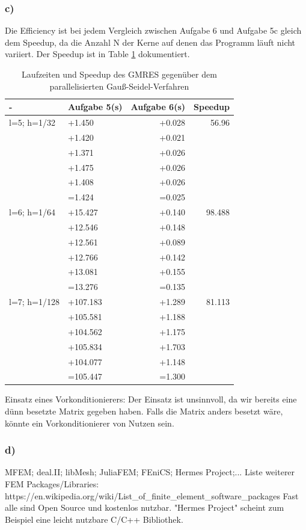 \documentclass{report}
\begin{document}
	\subsubsection{c)}
Die Efficiency ist bei jedem Vergleich zwischen Aufgabe 6 und Aufgabe 5c gleich dem Speedup, da die Anzahl N der Kerne auf denen das Programm läuft nicht variiert. Der Speedup ist in Table \ref{Table:6c} dokumentiert.\\
\begin{table}
\begin{tabular}{|l|l|r|r|}
		\hline
		- & Aufgabe 5(s) & Aufgabe 6(s) & Speedup\\
		\hline
		l=5; h=1/32 &  +1.450 & +0.028 & 56.96 \\
		& +1.420 & +0.021 &    \\
		& +1.371 & +0.026 &    \\
		& +1.475 & +0.026 &    \\
		& +1.408 & +0.026 &   \\
		&=1.424 & =0.025  & \\
		\hline
		l=6; h=1/64 &  +15.427 & +0.140 & 98.488 \\
		& +12.546 & +0.148 &    \\
		& +12.561 & +0.089 &    \\
		& +12.766 & +0.142 &    \\
		& +13.081 & +0.155 &   \\
		&=13.276 & =0.135  & \\
		\hline
		l=7; h=1/128 &  +107.183 & +1.289 & 81.113 \\
		& +105.581 & +1.188 &    \\
		& +104.562 & +1.175 &    \\
		& +105.834 & +1.703 &    \\
		& +104.077 & +1.148 &   \\
		&=105.447 & =1.300  & \\
		\hline
	\end{tabular}
	\caption{Laufzeiten und Speedup des GMRES gegenüber dem parallelisierten Gauß-Seidel-Verfahren}
	\label{Table:6c}
\end{table}
Einsatz eines Vorkonditionierers: Der Einsatz ist unsinnvoll, da wir bereits eine d\"{u}nn besetzte Matrix gegeben haben. Falls die Matrix anders besetzt wäre, könnte ein Vorkonditionierer von Nutzen sein.
	\subsubsection{d)}
MFEM; deal.II; libMesh; JuliaFEM; FEniCS; Hermes Project;...\newline
Liste weiterer FEM Packages/Libraries: https://en.wikipedia.org/wiki/List\_of\_finite\_element\_software\_packages \newline
Fast alle sind Open Source und kostenlos nutzbar. "Hermes Project" scheint zum Beispiel eine leicht nutzbare C/C++ Bibliothek.
\end{document}
